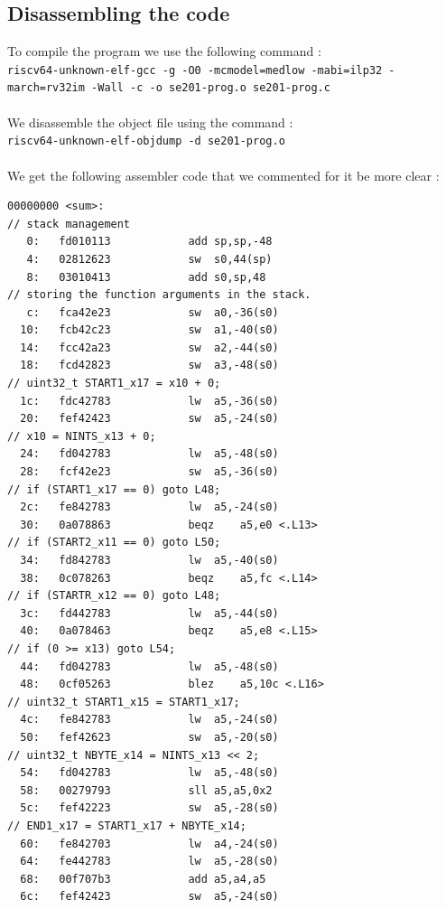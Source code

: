 \documentclass[a4paper,12pt]{article}
\begin{document}
\subsection{Disassembling the code}
To compile the program we use the following command :\\
\texttt{riscv64-unknown-elf-gcc -g -O0 -mcmodel=medlow -mabi=ilp32 -march=rv32im -Wall -c -o se201-prog.o se201-prog.c}\\\\
%
We disassemble the object file using the command :\\
\texttt{riscv64-unknown-elf-objdump -d se201-prog.o}\\\\
%
We get the following assembler code that we commented for it be more clear :
\begin{verbatim}
00000000 <sum>:
// stack management
   0:	fd010113          	add	sp,sp,-48
   4:	02812623          	sw	s0,44(sp)
   8:	03010413          	add	s0,sp,48
// storing the function arguments in the stack.
   c:	fca42e23          	sw	a0,-36(s0)
  10:	fcb42c23          	sw	a1,-40(s0)
  14:	fcc42a23          	sw	a2,-44(s0)
  18:	fcd42823          	sw	a3,-48(s0)
// uint32_t START1_x17 = x10 + 0;
  1c:	fdc42783          	lw	a5,-36(s0)
  20:	fef42423          	sw	a5,-24(s0)
// x10 = NINTS_x13 + 0;
  24:	fd042783          	lw	a5,-48(s0)
  28:	fcf42e23          	sw	a5,-36(s0)
// if (START1_x17 == 0) goto L48;
  2c:	fe842783          	lw	a5,-24(s0)
  30:	0a078863          	beqz	a5,e0 <.L13>
// if (START2_x11 == 0) goto L50;
  34:	fd842783          	lw	a5,-40(s0)
  38:	0c078263          	beqz	a5,fc <.L14>
// if (STARTR_x12 == 0) goto L48;
  3c:	fd442783          	lw	a5,-44(s0)
  40:	0a078463          	beqz	a5,e8 <.L15>
// if (0 >= x13) goto L54;
  44:	fd042783          	lw	a5,-48(s0)
  48:	0cf05263          	blez	a5,10c <.L16>
// uint32_t START1_x15 = START1_x17;
  4c:	fe842783          	lw	a5,-24(s0)
  50:	fef42623          	sw	a5,-20(s0)
// uint32_t NBYTE_x14 = NINTS_x13 << 2;
  54:	fd042783          	lw	a5,-48(s0)
  58:	00279793          	sll	a5,a5,0x2
  5c:	fef42223          	sw	a5,-28(s0)
// END1_x17 = START1_x17 + NBYTE_x14;
  60:	fe842703          	lw	a4,-24(s0)
  64:	fe442783          	lw	a5,-28(s0)
  68:	00f707b3          	add	a5,a4,a5
  6c:	fef42423          	sw	a5,-24(s0)


\end{verbatim}
\end{document}
